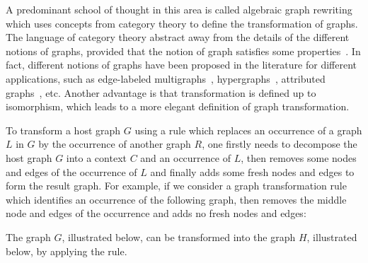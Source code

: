  A predominant school of thought in this area is called algebraic graph rewriting which uses concepts from category theory to define the transformation of graphs. The language of category theory abstract away from the details of the different notions of graphs, provided that the notion of graph satisfies some properties~\cite{lack2004adhesive,overbeek2023graph}. 
 In fact, different notions of graphs have been proposed in the literature for different applications, such as edge-labeled multigraphs~\cite{konig2018atutorial,corradini1997algebraic}, hypergraphs~\cite{plump1993hypergraph}, attributed graphs~\cite{ehrig2006fundamentals}, etc. Another advantage is that transformation is defined up to isomorphism, which leads to a more elegant definition of graph transformation.

  To transform a host graph $G$ using a rule which replaces an occurrence of a graph $L$ in $G$ by the occurrence of another graph $R$, one firstly needs to decompose the host graph $G$ into a context $C$ and an occurrence of $L$, then removes some nodes and edges of the occurrence of $L$ and finally adds some fresh nodes and edges to form the result graph. For example, if we consider a graph transformation rule which identifies an occurrence of the following graph, then removes the middle node and edges of the occurrence and adds no fresh nodes and edges:
\begin{center}
\end{center}
The graph $G$, illustrated below, can be transformed into the graph $H$, illustrated below, by applying the rule.
